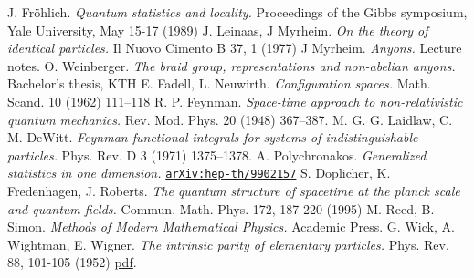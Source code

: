 \begin{thebibliography}{99}
   J. Fröhlich. \textit{Quantum statistics and locality.} Proceedings of the Gibbs symposium, Yale University, May 15-17 (1989)
   J. Leinaas, J Myrheim. \textit{On the theory of identical particles.} Il Nuovo Cimento B 37, 1 (1977)
   J Myrheim. \textit{Anyons.} Lecture notes.
   O. Weinberger. \textit{The braid group, representations and non-abelian anyons.} Bachelor's thesis, KTH
   E. Fadell, L. Neuwirth. \textit{Configuration spaces.} Math. Scand. 10 (1962) 111–118
   R. P. Feynman. \textit{Space-time approach to non-relativistic quantum mechanics.} Rev. Mod. Phys. 20 (1948) 367–387.
   M. G. G. Laidlaw, C. M. DeWitt. \textit{Feynman functional integrals for systems of indistinguishable particles.} Phys. Rev. D 3 (1971) 1375–1378.
   A. Polychronakos. \textit{Generalized statistics in one dimension.} \href{https://arxiv.org/abs/hep-th/9902157}{\texttt{arXiv:hep-th/9902157}}
   S. Doplicher, K. Fredenhagen, J. Roberts. \textit{The quantum structure of spacetime at the planck scale and quantum fields.} Commun. Math. Phys. 172, 187-220 (1995)
   M. Reed, B. Simon. \textit{Methods of Modern Mathematical Physics.} Academic Press.
   G. Wick, A. Wightman, E. Wigner. \textit{The intrinsic parity of elementary particles.} Phys. Rev. 88, 101-105 (1952) \href{http://dieumsnh.qfb.umich.mx/archivoshistoricosmq/ModernaHist/Wick.pdf}{pdf}.



\end{thebibliography}
